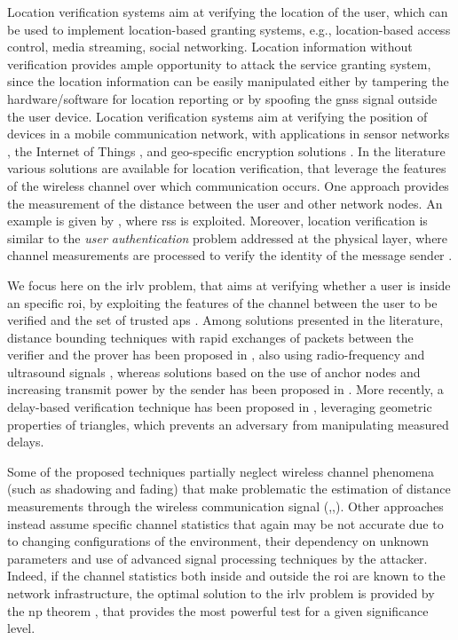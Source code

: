 \documentclass[draftcls,onecolumn,12pt]{IEEEtran}
\begin{document}
Location verification systems aim at verifying the location of the user, which can be used to implement location-based granting systems, e.g., location-based access control, media streaming, social networking. Location information without verification provides ample opportunity to attack the service granting system, since the location information can be easily manipulated either by tampering the hardware/software for location reporting or by spoofing the \ac{gnss} signal outside the user device. Location verification systems aim at verifying the position of devices in a mobile communication network, with applications in sensor networks \cite{Zeng-survey, 8376254, wei2013}, the Internet of Things \cite{7903611}, and geo-specific encryption solutions \cite{quaglia}. In the literature various solutions are available for location verification, that leverage the features of the wireless channel over which communication occurs. One approach provides the measurement of the distance between the user and other network nodes. An example is given by \cite{yan2016location}, where \ac{rss} is exploited. Moreover, location verification is similar to the  {\em user authentication} problem addressed at the physical layer, where  channel measurements are  processed to verify the identity of the message sender \cite{7270404}. 

We focus here on the \ac{irlv} problem, that aims at verifying whether a user is inside an specific \ac{roi}, by exploiting the features of the channel between the user to be verified and the set of trusted \acp{ap} \cite{Zeng-survey}. Among solutions presented in the literature, distance bounding techniques with rapid exchanges of packets between the verifier and the prover has been proposed in \cite{Brands}, also using radio-frequency and ultrasound signals \cite{Sastry}, whereas solutions based on the use of anchor nodes and increasing transmit power by the sender has been proposed in \cite{Vora}. More recently, a delay-based verification technique has been proposed  in \cite{7145434}, leveraging geometric properties of triangles, which prevents an adversary from manipulating measured delays.  

Some of the proposed techniques partially neglect wireless channel phenomena (such as shadowing and fading) that make  problematic the estimation of distance measurements through the wireless communication signal (\cite{Brands},\cite{Sastry},\cite{Vora}). Other approaches instead assume specific channel statistics \cite{quaglia} that again may be not accurate due to to changing configurations of the environment, their dependency on unknown parameters and use of advanced signal processing techniques by the attacker. Indeed, if the channel statistics both inside and outside the \ac{roi} are known to the network infrastructure, the optimal solution to the \ac{irlv} problem is provided by the \ac{np} theorem \cite{Cover-book}, that provides the most powerful test for a given significance level. 
\end{document}

